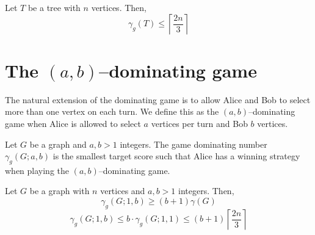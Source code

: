 \begin{theorem}
    Let $T$ be a tree with $n$ vertices. Then,    
    \[ \gamma_g(T) \leq \left\lceil \frac{2n}{3} \right\rceil\]
\end{theorem}
 
%
%    
%        
%    
%   
%       

\section{The $(a,b)$--dominating game}

The natural extension of the dominating game is to allow Alice and Bob to select more than one vertex on each turn. We define this as the $(a,b)$--dominating game when Alice is allowed to select $a$ vertices per turn and Bob $b$ vertices.

\begin{definition}
    Let $G$ be a graph and $a,b>1$ integers. The game dominating number $\gamma_g(G;a,b)$ is the smallest target score such that Alice has a winning strategy when playing the $(a,b)$--dominating game.
\end{definition}

\begin{theorem} %
    Let $G$ be a graph with $n$ vertices and $a,b>1$ integers. Then,
    \[\gamma_{g}(G;1,b) \geq (b+1)\gamma(G) \]    
    \[\gamma_{g}(G;1,b) \leq b\cdot\gamma_{g}(G;1,1) \leq (b+1)\left\lceil \frac{2n}{3} \right\rceil\]
\end{theorem}













